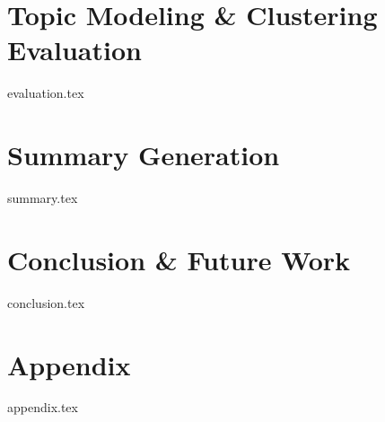 \documentclass[m,bachelor,binding,palatino,twoside]{WeSTthesis}
\theoremstyle{definition}
\begin{document}
\section{Topic Modeling \& Clustering Evaluation}
{evaluation.tex}

\section{Summary Generation}
{summary.tex}

\section{Conclusion \& Future Work}
{conclusion.tex}




\newpage

\section{Appendix}
{appendix.tex}
\end{document}
